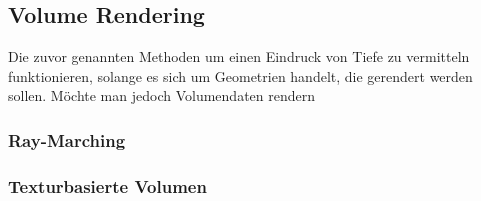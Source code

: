 \newpage
\subsection{Volume Rendering}

Die zuvor genannten Methoden um einen Eindruck von Tiefe zu vermitteln funktionieren, solange es sich um Geometrien handelt, 
die gerendert werden sollen. Möchte man jedoch Volumendaten rendern
\subsubsection{Ray-Marching}
\subsubsection{Texturbasierte Volumen}